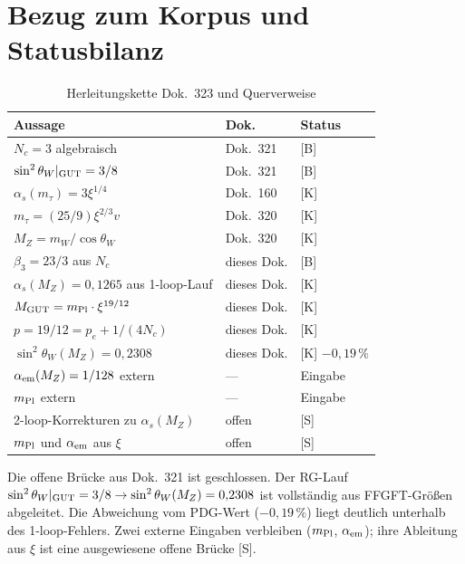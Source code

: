 \section{Bezug zum Korpus und Statusbilanz}

\begin{table}[h]
\centering
\caption{Herleitungskette Dok.~323 und Querverweise}
\label{tab:korpus}
\begin{tabular}{lll}
\toprule
Aussage & Dok. & Status \\
\midrule
$N_c = 3$ algebraisch & Dok.~321 & [B] \\
$\sin^2\theta_W|_{\rm GUT} = 3/8$ & Dok.~321 & [B] \\
$\alpha_s(m_\tau) = 3\xi^{1/4}$ & Dok.~160 & [K] \\
$m_\tau = (25/9)\xi^{2/3}v$ & Dok.~320 & [K] \\
$M_Z = m_W/\!\cos\theta_W$ & Dok.~320 & [K] \\
$\beta_3 = 23/3$ aus $N_c$ & dieses Dok. & [B] \\
$\alpha_s(M_Z) = 0{,}1265$ aus 1-loop-Lauf & dieses Dok. & [K] \\
$M_{\rm GUT} = m_{\rm Pl}\cdot\xi^{19/12}$ & dieses Dok. & [K] \\
$p = 19/12 = p_e + 1/(4N_c)$ & dieses Dok. & [K] \\
$\sin^2\theta_W(M_Z) = 0{,}2308$ & dieses Dok. & [K] $-0{,}19\,\%$ \\
\midrule
$\alpha_{\rm em}(M_Z) = 1/128$ extern & --- & Eingabe \\
$m_{\rm Pl}$ extern & --- & Eingabe \\
2-loop-Korrekturen zu $\alpha_s(M_Z)$ & offen & [S] \\
$m_{\rm Pl}$ und $\alpha_{\rm em}$ aus $\xi$ & offen & [S] \\
\bottomrule
\end{tabular}
\end{table}

\begin{keyresult}
Die offene Brücke aus Dok.~321 ist geschlossen. Der RG-Lauf
$\sin^2\theta_W|_{\rm GUT} = 3/8 \to \sin^2\theta_W(M_Z) = 0{,}2308$
ist vollständig aus FFGFT-Größen abgeleitet. Die Abweichung vom
PDG-Wert ($-0{,}19\,\%$) liegt deutlich unterhalb des 1-loop-Fehlers.
Zwei externe Eingaben verbleiben ($m_{\rm Pl}$, $\alpha_{\rm em}$);
ihre Ableitung aus $\xi$ ist eine ausgewiesene offene Brücke [S].
\end{keyresult}
